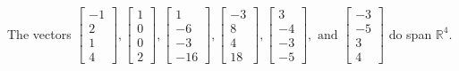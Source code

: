 \begin{exercise}
\begin{exerciseStatement}
  \end{exerciseStatement}
  \begin{exerciseAnswer}
   The vectors \(\left[\begin{array}{r}
-1 \\
2 \\
1 \\
4
\end{array}\right] , \left[\begin{array}{r}
1 \\
0 \\
0 \\
2
\end{array}\right] , \left[\begin{array}{r}
1 \\
-6 \\
-3 \\
-16
\end{array}\right] , \left[\begin{array}{r}
-3 \\
8 \\
4 \\
18
\end{array}\right] , \left[\begin{array}{r}
3 \\
-4 \\
-3 \\
-5
\end{array}\right] , \text{ and } \left[\begin{array}{r}
-3 \\
-5 \\
3 \\
4
\end{array}\right]\) 
  	 do  
	span \(\mathbb{R}^4\).
  


  \end{exerciseAnswer}
\end{exercise}